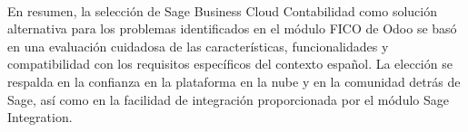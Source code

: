 \paragraph{}
En resumen, la selección de Sage Business Cloud Contabilidad como solución alternativa para los problemas identificados en el módulo FICO de Odoo se basó en una evaluación cuidadosa de las características, funcionalidades y compatibilidad con los requisitos específicos del contexto español. La elección se respalda en la confianza en la plataforma en la nube y en la comunidad detrás de Sage, así como en la facilidad de integración proporcionada por el módulo Sage Integration.
